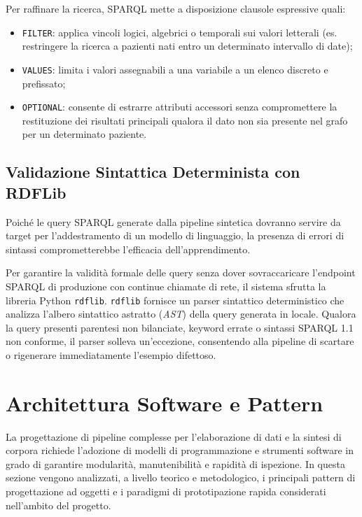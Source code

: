 \documentclass[12pt,a4paper,openright,twoside]{book}
\begin{document}
Per raffinare la ricerca, SPARQL mette a disposizione clausole espressive quali:
\begin{itemize}
    \item \texttt{FILTER}: applica vincoli logici, algebrici o temporali sui
          valori letterali (es. restringere la ricerca a pazienti nati entro un
          determinato intervallo di date);
    \item \texttt{VALUES}: limita i valori assegnabili a una variabile a un
          elenco discreto e prefissato;
    \item \texttt{OPTIONAL}: consente di estrarre attributi accessori senza
          compromettere la restituzione dei risultati principali qualora il dato
          non sia presente nel grafo per un determinato paziente.
\end{itemize}

\subsection{Validazione Sintattica Determinista con RDFLib}
Poiché le query SPARQL generate dalla pipeline sintetica dovranno servire da
target per l'addestramento di un modello di linguaggio, la presenza di errori di
sintassi comprometterebbe l'efficacia dell'apprendimento.

Per garantire la validità formale delle query senza dover sovraccaricare
l'endpoint SPARQL di produzione con continue chiamate di rete, il sistema
sfrutta la libreria Python \texttt{rdflib}. \texttt{rdflib} fornisce un parser
sintattico deterministico che analizza l'albero sintattico astratto
(\textit{AST}) della query generata in locale. Qualora la query presenti
parentesi non bilanciate, keyword errate o sintassi SPARQL 1.1 non conforme, il
parser solleva un'eccezione, consentendo alla pipeline di scartare o rigenerare
immediatamente l'esempio difettoso.

\section{Architettura Software e Pattern}
\label{sec:bg-software-tools}

La progettazione di pipeline complesse per l'elaborazione di dati e la sintesi
di corpora richiede l'adozione di modelli di programmazione e strumenti software
in grado di garantire modularità, manutenibilità e rapidità di ispezione. In
questa sezione vengono analizzati, a livello teorico e metodologico, i
principali pattern di progettazione ad oggetti e i paradigmi di prototipazione
rapida considerati nell'ambito del progetto.
\end{document}
